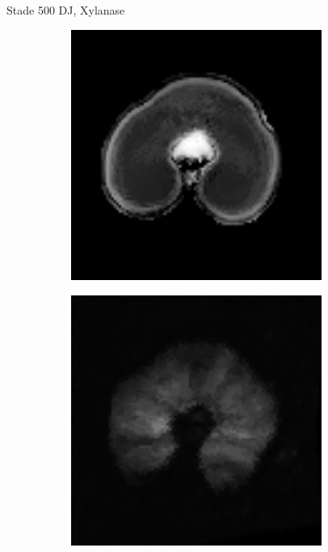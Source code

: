 \documentclass[10pt]{beamer}
\begin{document}
\begin{frame}{Stade 500 DJ, Xylanase}
  \begin{figure}[ht]
    \centering
    \begin{subfigure}[t]{0.33\textwidth}
      \centering
      \includegraphics[width=0.9\textwidth]{fig/stats_500Xyl_t2_irm}
    \end{subfigure}%
    \begin{subfigure}[t]{0.33\textwidth}
      \centering
      \includegraphics[width=0.9\textwidth]{fig/stats_500Xyl_t2}
    \end{subfigure}%
    
  \end{figure}
\end{frame}
\end{document}
